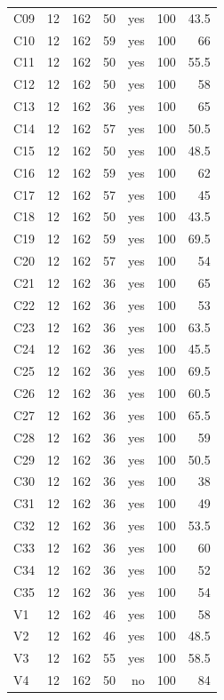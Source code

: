 \begin{longtable}{lrrrrrr}
C09 & 12 & 162 & 50 & yes & 100 & 43.5 \\
C10 & 12 & 162 & 59 & yes & 100 & 66 \\
C11 & 12 & 162 & 50 & yes & 100 & 55.5 \\
C12 & 12 & 162 & 50 & yes & 100 & 58 \\
C13 & 12 & 162 & 36 & yes & 100 & 65 \\
C14 & 12 & 162 & 57 & yes & 100 & 50.5 \\
C15 & 12 & 162 & 50 & yes & 100 & 48.5 \\
C16 & 12 & 162 & 59 & yes & 100 & 62 \\
C17 & 12 & 162 & 57 & yes & 100 & 45 \\
C18 & 12 & 162 & 50 & yes & 100 & 43.5 \\
C19 & 12 & 162 & 59 & yes & 100 & 69.5 \\
C20 & 12 & 162 & 57 & yes & 100 & 54 \\
C21 & 12 & 162 & 36 & yes & 100 & 65 \\
C22 & 12 & 162 & 36 & yes & 100 & 53 \\
C23 & 12 & 162 & 36 & yes & 100 & 63.5 \\
C24 & 12 & 162 & 36 & yes & 100 & 45.5 \\
C25 & 12 & 162 & 36 & yes & 100 & 69.5 \\
C26 & 12 & 162 & 36 & yes & 100 & 60.5 \\
C27 & 12 & 162 & 36 & yes & 100 & 65.5 \\
C28 & 12 & 162 & 36 & yes & 100 & 59 \\
C29 & 12 & 162 & 36 & yes & 100 & 50.5 \\
C30 & 12 & 162 & 36 & yes & 100 & 38 \\
C31 & 12 & 162 & 36 & yes & 100 & 49 \\
C32 & 12 & 162 & 36 & yes & 100 & 53.5 \\
C33 & 12 & 162 & 36 & yes & 100 & 60 \\
C34 & 12 & 162 & 36 & yes & 100 & 52 \\
C35 & 12 & 162 & 36 & yes & 100 & 54 \\
V1 & 12 & 162 & 46 & yes & 100 & 58 \\
V2 & 12 & 162 & 46 & yes & 100 & 48.5 \\
V3 & 12 & 162 & 55 & yes & 100 & 58.5 \\
V4 & 12 & 162 & 50 & no & 100 & 84 \\
\bottomrule
\end{longtable}
\endgroup

